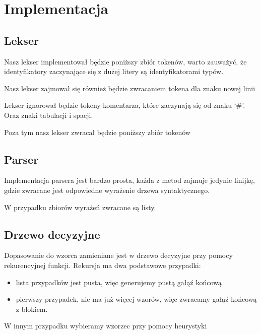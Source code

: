 \documentclass{article}
\begin{document}
\section{Implementacja}
\subsection{Lekser}
Nasz lekser implementował będzie poniższy zbiór tokenów, warto zauważyć, że identyfikatory zaczynające się z dużej litery są identyfikatorami typów.

Nasz lekser zajmował się również będzie zwracaniem tokena dla znaku nowej linii

Lekser ignorował będzie tokeny komentarza, które zaczynają się od znaku `\#'. Oraz znaki tabulacji i spacji.
\newpage


Poza tym nasz lekser zwracał będzie poniższy zbiór tokenów


\subsection{Parser}
Implementacja parsera jest bardzo prosta, każda z metod zajmuje jedynie linijkę, gdzie zwracane jest odpowiedne wyrażenie drzewa syntaktycznego.

W przypadku zbiorów wyrażeń zwracane są listy.\newpage


\subsection{Drzewo decyzyjne}



Dopasowanie do wzorca zamieniane jest w drzewo decyzyjne przy pomocy rekurencyjnej funkcji.
Rekursja ma dwa podstawowe przypadki:
\begin{itemize}
  \item lista przypadków jest pusta, więc generujemy pustą gałąź końcową
  \item pierwszy przypadek, nie ma już więcej wzorów, więc zwracamy gałąź końcową z blokiem.
\end{itemize}

W innym przypadku wybieramy wzorzec przy pomocy heurystyki\newpage

\end{document}
